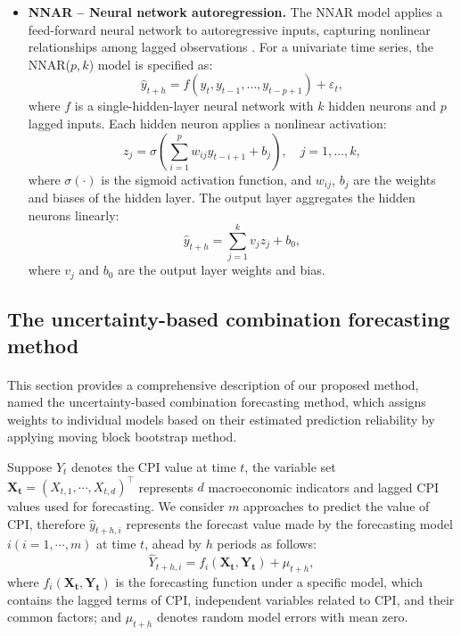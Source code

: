 \documentclass[12pt]{article}
\begin{document}
\begin{itemize}
      \item \textbf{NNAR -- Neural network autoregression.} The NNAR model applies a feed-forward neural network to autoregressive inputs, capturing nonlinear relationships among lagged observations \citep{hyndman2018forecasting, zhang1998forecasting}. For a univariate time series, the NNAR($p, k$) model is specified as:
      \begin{equation}
      \hat{y}_{t+h} = f(y_t, y_{t-1}, \dots, y_{t-p+1}) + \varepsilon_t,
      \end{equation}
      where $f$ is a single-hidden-layer neural network with $k$ hidden neurons and $p$ lagged inputs. Each hidden neuron applies a nonlinear activation:
      \begin{equation}
      z_j = \sigma\left(\sum_{i=1}^{p} w_{ij} y_{t-i+1} + b_j\right), \quad j = 1, \dots, k,
      \end{equation}
      where $\sigma(\cdot)$ is the sigmoid activation function, and $w_{ij}$, $b_j$ are the weights and biases of the hidden layer. The output layer aggregates the hidden neurons linearly:
      \begin{equation}
      \hat{y}_{t+h} = \sum_{j=1}^{k} v_j z_j + b_0,
      \end{equation}
      where $v_j$ and $b_0$ are the output layer weights and bias.
  \end{itemize}



\subsection{The uncertainty-based combination forecasting method}
\paragraph{}

This section provides a comprehensive description of our proposed method, named the uncertainty-based combination forecasting method, which assigns weights to individual models based on their estimated prediction reliability by applying moving block bootstrap method.


Suppose $Y_t$ denotes the CPI value at time $t$, the variable set $\bm{X_t} = (X_{t,1}, \cdots, X_{t,d})^\top$ represents $d$ macroeconomic indicators and lagged CPI values used for forecasting. We consider $m$ approaches to predict the value of CPI, therefore $\hat{y}_{t+h, i}$ represents the forecast value made by the forecasting model $i(i = 1, \cdots, m)$ at time $t$, ahead by $h$ periods as follows:
\begin{equation}
     \hat{Y}_{t+h,i} = f_i(\bm{X_t}, \bm{Y_t}) + \mu_{t+h}, 
\end{equation}
where $f_i(\bm{X_t}, \bm{Y_t})$ is the forecasting function under a specific model, which contains the lagged terms of CPI, independent variables related to CPI, and their common factors; and $\mu_{t+h}$ denotes random model errors with mean zero.
\end{document}
